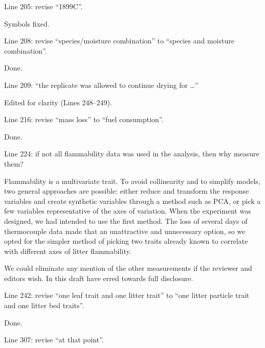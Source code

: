 \documentclass[letterpaper, 12pt]{letter}
\begin{document}
\begin{letter}{}
\begin{quoting}
Line 205: revise “1899C”.
\end{quoting}

Symbols fixed.

\begin{quoting}
  Line 208: revise “species/moisture combination” to “species and moisture
  combination”.
\end{quoting}

Done.

\begin{quoting}
  Line 209: “the replicate was allowed to continue drying for …”
\end{quoting}

Edited for clarity (Lines 248--249).

\begin{quoting}
  Line 216: revise “mass loss” to “fuel consumption”.
\end{quoting}

Done.

\begin{quoting}
  Line 224: if not all flammability data was used in the analysis, then why
  measure them?
\end{quoting}

Flammability is a multivariate trait. To avoid collinearity and to simplify
models, two general approaches are possible: either reduce and transform the
response variables and create synthetic variables through a method such as PCA,
or pick a few variables representative of the axes of variation. When the
experiment was designed, we had intended to use the first method. The loss of
several days of thermocouple data made that an unattractive and unnecessary
option, so we opted for the simpler method of picking two traits already known
to correlate with different axes of litter flammability.

We could eliminate any mention of the other measurements if the reviewer and
editors wish. In this draft have erred towards full disclosure.

\begin{quoting}
  Line 242: revise “one leaf trait and one litter trait” to “one litter
  particle trait and one litter bed traits”.
\end{quoting}

Done.

\begin{quoting}
  Line 307: revise “at that point”.
\end{quoting}


\end{letter}
\end{document}
